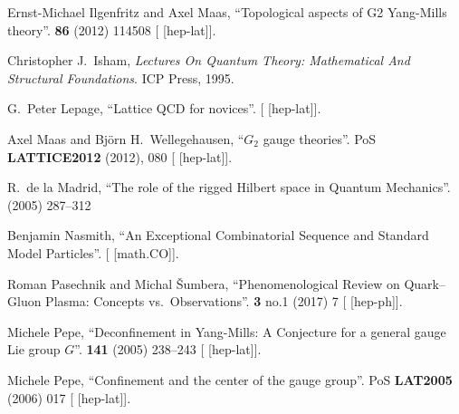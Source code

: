 \begin{thebibliography}{99}
Ernst-Michael Ilgenfritz and Axel Maas,
``Topological aspects of G2 Yang-Mills theory''.
 \textbf{86} (2012) 114508
{\tt{}}
[ [hep-lat]].

Christopher J.\ Isham,
\textit{Lectures On Quantum Theory: Mathematical And Structural Foundations}.
ICP Press, 1995.


G.~Peter Lepage,
``Lattice QCD for novices''.
[ [hep-lat]].


Axel Maas and Bj\"{o}rn H.~Wellegehausen,
``$G_2$ gauge theories''.
PoS \textbf{LATTICE2012} (2012), 080
{\tt{}}
[ [hep-lat]].

R.~de la Madrid,
``The role of the rigged Hilbert space in Quantum Mechanics''.
  (2005) 287--312 
{\tt{}}

Benjamin Nasmith,
``An Exceptional Combinatorial Sequence and Standard Model Particles''.
[ [math.CO]].

Roman Pasechnik and Michal \v{S}umbera,
``Phenomenological Review on Quark--Gluon Plasma: Concepts vs.\ Observations''.
 \textbf{3} no.1 (2017) 7
{\tt{}}
[ [hep-ph]].

Michele Pepe,
``Deconfinement in Yang-Mills: A Conjecture for a general gauge Lie group $G$''.
 \textbf{141} (2005) 238--243
{\tt{}}
[ [hep-lat]].

Michele Pepe,
``Confinement and the center of the gauge group''.
PoS \textbf{LAT2005} (2006) 017
{\tt{}}
[ [hep-lat]].


\end{thebibliography}
